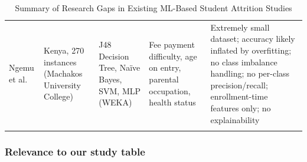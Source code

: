 \documentclass[12pt]{report}
\begin{document}
\begin{longtable}{L{2.4cm} L{2.2cm} L{2.4cm} L{2.4cm} L{3.4cm}}
Ngemu et al.\ \parencite{ngemu2015} &
Kenya, 270 instances (Machakos University College) &
J48 Decision Tree, Naïve Bayes, SVM, MLP (WEKA) &
Fee payment difficulty, age on entry, parental occupation, health status &
Extremely small dataset; accuracy likely inflated by overfitting; no class imbalance handling; no per-class precision/recall; enrollment-time features only; no explainability \\[6pt]

\caption{Summary of Research Gaps in Existing ML-Based Student Attrition Studies}
\label{tab:research_gaps}
\end{longtable}


\subsubsection{Relevance to our study table}
\end{document}
